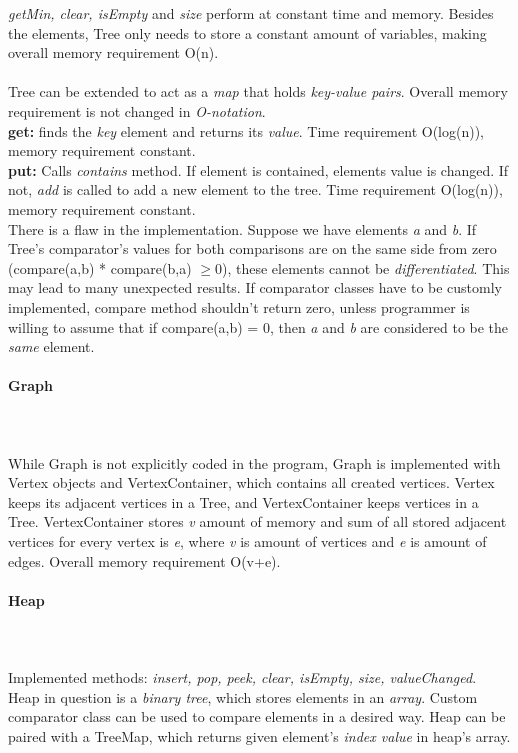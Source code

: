 \documentclass[a4paper,12pt]{article}
\begin{document}
\emph{getMin, clear, isEmpty} and \emph{size} perform at constant time and memory. Besides the elements, Tree only needs to store a constant amount of variables, making overall memory requirement O(n).\\
\\
Tree can be extended to act as a \emph{map} that holds \emph{key-value pairs}. Overall memory requirement is not changed in \emph{O-notation}.\\

\textbf{get:} finds the \emph{key} element and returns its \emph{value}. Time requirement O(log(n)), memory requirement constant.
\\

\textbf{put:} Calls \emph{contains} method. If element is contained, elements value is changed. If not, \emph{add} is called to add a new element to the tree. Time requirement O(log(n)), memory requirement constant.
\\

There is a flaw in the implementation. Suppose we have elements \emph{a} and \emph{b}. If Tree's comparator's values for both comparisons are on the same side from zero (compare(a,b) * compare(b,a) $\geq{0}$), these elements cannot be \emph{differentiated}. This may lead to many unexpected results. If comparator classes have to be customly implemented, compare method shouldn't return zero, unless programmer is willing to assume that if compare(a,b) = 0, then \emph{a} and \emph{b} are considered to be the \emph{same} element.

\paragraph{\large Graph} \hspace{0pt} \\
\\
While Graph is not explicitly coded in the program, Graph is implemented with Vertex objects and VertexContainer, which contains all created vertices. Vertex keeps its adjacent vertices in a Tree, and VertexContainer keeps vertices in a Tree. VertexContainer stores \emph{v} amount of memory and sum of all stored adjacent vertices for every vertex is \emph{e}, where \emph{v} is amount of vertices and \emph{e} is amount of edges. Overall memory requirement O(v+e).
\\

\paragraph{\large Heap} \hspace{0pt} \\
\\
Implemented methods: \emph{insert, pop, peek, clear, isEmpty, size, valueChanged}.
\\
Heap in question is a \emph{binary tree}, which stores elements in an \emph{array}. Custom comparator class can be used to compare elements in a desired way. Heap can be paired with a TreeMap, which returns given element's \emph{index value} in heap's array.\\
\end{document}
